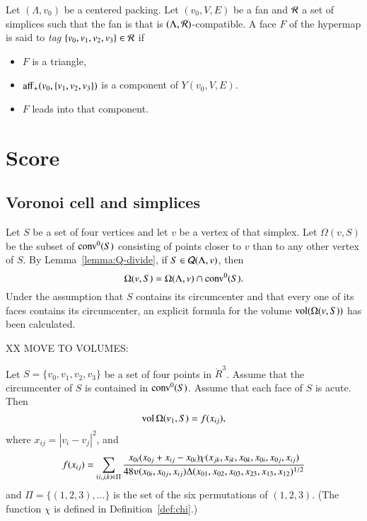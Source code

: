 \begin{definition}
Let $(\Lambda,v_0)$ be a centered packing.  Let $(v_0,V,E)$ be a fan
and ${\mathcal R}$ a set of simplices such that the fan is
that is $(\Lambda,{\mathcal R})$-compatible.  A face $F$ of the hypermap is said
to {\it tag} $\{v_0,v_1,v_2,v_3\}\in {\mathcal R}$ if 
\begin{itemize}
 \item $F$ is a triangle,
 \item  ${\operatorname{aff}}_+(v_0,\{v_1,v_2,v_3\})$ is a component of
  $Y(v_0,V,E)$.
 \item $F$ leads into that component.
\end{itemize}
\end{definition}


\section{Score}





\subsection{Voronoi cell and simplices}


Let $S$ be a set of four vertices and let $v$ be a vertex of that simplex. Let
$\Omega(v,S)$ be the subset of ${\operatorname{conv}}^0(S)$ consisting of points closer
to $v$ than to any other vertex of $S$. By
Lemma~\ref{lemma:Q-divide}, if $S\in{\mathcal Q}(\Lambda,v)$, then
$$\Omega(v,S) = \Omega(\Lambda,v)\cap{\operatorname{conv}}^0(S).$$
Under the assumption that $S$ contains its circumcenter and that
every one of its faces contains its circumcenter, an explicit
formula for the volume ${\operatorname{vol}}(\Omega(v,S))$ has been
calculated.  %

XX MOVE TO VOLUMES:

\begin{lemma}  Let $S = \{v_0,v_1,v_2,v_3\}$ be a set of four points in $\ring{R}^3$.
Assume that the circumcenter of $S$ is contained in ${\operatorname{conv}}^0(S)$.  Assume
that each face of $S$ is acute.
Then 
  $$
  {\operatorname{vol}}\,\Omega(v_1,S) = f(x_{ij}),
  $$ 
where $x_{ij} = |v_i-v_j|^2$, and
$$
   f(x_{ij}) = \sum_{(i,j,k)\in \Pi} \frac{x_{0i} (x_{0j}+x_{ij}-x_{0i})\chi(x_{jk},x_{ik},x_{0k},x_{0i},x_{0j},x_{ij})}
   {48\ups(x_{0i},x_{0j},x_{ij})\Delta(x_{01},x_{02},x_{03},x_{23},x_{13},x_{12})^{1/2}}
$$
and $\Pi = \{(1,2,3),\ldots\}$ is the set of the six permutations of $(1,2,3)$.
(The function $\chi$ is defined in Definition~\ref{def:chi}.)
\end{lemma}

